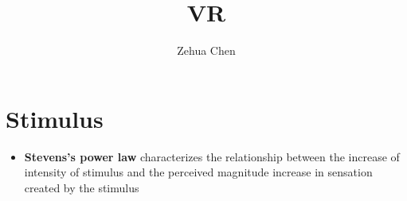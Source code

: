 \documentclass[letterpaper, 11pt]{report}
\title{VR}
\author{Zehua Chen}
\begin{document}
  \maketitle
  \tableofcontents

  \chapter{Stimulus}

  \begin{itemize}
    \item \textbf{Stevens's power law} characterizes the relationship
    between the increase of intensity of stimulus and the perceived magnitude
    increase in sensation created by the stimulus
  \end{itemize}
\end{document}
